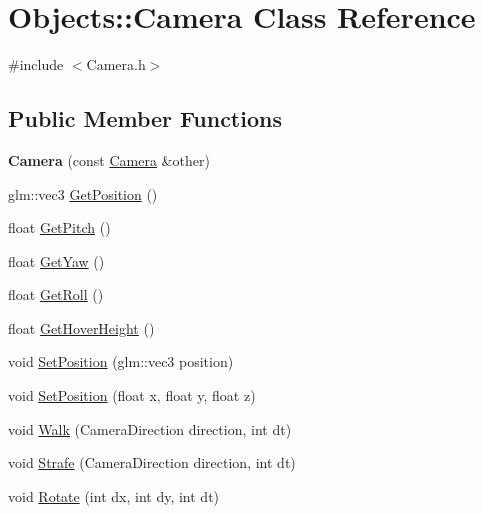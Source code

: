 \hypertarget{class_objects_1_1_camera}{}\section{Objects\+:\+:Camera Class Reference}
\label{class_objects_1_1_camera}


{\ttfamily \#include $<$Camera.\+h$>$}

\subsection*{Public Member Functions}
\begin{DoxyCompactItemize}
\item 
\mbox{\label{class_objects_1_1_camera_ac3d1d2630c776a0925e1023cdf3cc11d}} 
{\bfseries Camera} (const \hyperlink{class_objects_1_1_camera}{Camera} \&other)
\item 
glm\+::vec3 \hyperlink{class_objects_1_1_camera_a8296a922839ed2ce11625d4062fdc00b}{Get\+Position} ()
\item 
float \hyperlink{class_objects_1_1_camera_a8febc4d7efdd0026ea17348bc64a9c0d}{Get\+Pitch} ()
\item 
float \hyperlink{class_objects_1_1_camera_a9af8c41d0824a875f650a8bcce6047f5}{Get\+Yaw} ()
\item 
float \hyperlink{class_objects_1_1_camera_a03d47a22c8591b487f11d30cff16323b}{Get\+Roll} ()
\item 
float \hyperlink{class_objects_1_1_camera_a9a84a8e6975b39d4f7c7b9826570b329}{Get\+Hover\+Height} ()
\item 
void \hyperlink{class_objects_1_1_camera_abf6ffbfbcdec52ecc9dbca948e8587cb}{Set\+Position} (glm\+::vec3 position)
\item 
void \hyperlink{class_objects_1_1_camera_aff13b2394968f618ace6caa6733bb672}{Set\+Position} (float x, float y, float z)
\item 
void \hyperlink{class_objects_1_1_camera_abcdee889581a7c03c751d091f3b5ea76}{Walk} (Camera\+Direction direction, int dt)
\item 
void \hyperlink{class_objects_1_1_camera_af74a18829347232af29cde68a3899331}{Strafe} (Camera\+Direction direction, int dt)
\item 
void \hyperlink{class_objects_1_1_camera_a08e2bef0b17c237525c9e8ad1695887b}{Rotate} (int dx, int dy, int dt)
\end{DoxyCompactItemize}



